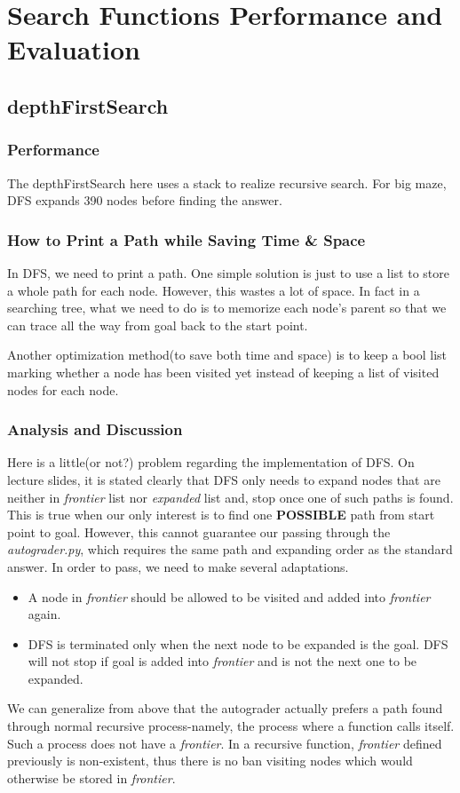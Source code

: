 \documentclass{article}
\begin{document}
\section{Search Functions Performance and Evaluation}
  \subsection{depthFirstSearch}
    \subsubsection{Performance}
    The depthFirstSearch here uses a stack to realize recursive search. For big maze, DFS expands 390 nodes before finding the answer.
    \subsubsection{How to Print a Path while Saving Time \& Space}
    In DFS, we need to print a path. One simple solution is just to use a list to store a whole path for each node. However, this wastes a lot of space. In fact in a searching tree, what we need to do is to memorize each node's parent so that we can trace all the way from goal back to the start point.\par
    Another optimization method(to save both time and space) is to keep a bool list marking whether a node has been visited yet instead of keeping a list of visited nodes for each node.
    \subsubsection{Analysis and Discussion}
    Here is a little(or not?) problem regarding the implementation of DFS. On lecture slides, it is stated clearly that DFS only needs to expand nodes that are neither in \textit{frontier} list nor \textit{expanded} list and, stop once one of such paths is found. This is true when our only interest is to find one \textbf{POSSIBLE} path from start point to goal. However, this cannot guarantee our passing through the \textit{autograder.py}, which requires the same path and expanding order as the standard answer. In order to pass, we need to make several adaptations.
    \begin{itemize}
      \item A node in \textit{frontier} should be allowed to be visited and added into \textit{frontier} again.
      \item DFS is terminated only when the next node to be expanded is the goal. DFS will not stop if goal is added into \textit{frontier} and is not the next one to be expanded.
    \end{itemize}\par
    We can generalize from above that the autograder actually prefers a path found through normal recursive process-namely, the process where a function calls itself. Such a process does not have a \textit{frontier}. In a recursive function, \textit{frontier} defined previously is non-existent, thus there is no ban visiting nodes which would otherwise be stored in \textit{frontier}.
\end{document}
